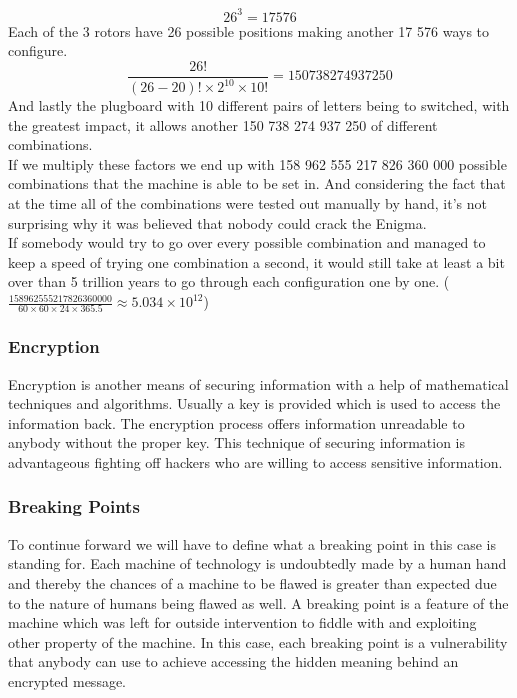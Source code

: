 \documentclass[conference,compsoc]{IEEEtran}
\begin{document}
\begin{equation}
    26^3=17576
\end{equation}
Each of the 3 rotors have 26 possible positions making another 17 576 ways to configure.\\
\begin{equation}
    \frac{26!}{(26-20)!\times2^{10}\times10!}=150738274937250
\end{equation}
And lastly the plugboard with 10 different pairs of letters being to switched, with the greatest impact, it allows another 150 738 274 937 250 of different combinations.\\
If we multiply these factors we end up with 158 962 555 217 826 360 000 possible combinations that the machine is able to be set in. And considering the fact that at the time all of the combinations were tested out manually by hand, it's not surprising why it was believed that nobody could crack the Enigma.\\
If somebody would try to go over every possible combination and managed to keep a speed of trying one combination a second, it would still take at least a bit over than 5 trillion years to go through each configuration one by one. ($\frac{158962555217826360000}{60\times60\times24\times365.5}\approx5.034\times10^{12}$)

\subsubsection{Encryption} Encryption is another means of securing information with a help of mathematical techniques and algorithms. Usually a key is provided which is used to access the information back. The encryption process offers information unreadable to anybody without the proper key. This technique of securing information is advantageous fighting off hackers who are willing to access sensitive information.\\

\subsubsection{Breaking Points} To continue forward we will have to define what a breaking point in this case is standing for. Each machine of technology is undoubtedly made by a human hand and thereby the chances of a machine to be flawed is greater than expected due to the nature of humans being flawed as well. A breaking point is a feature of the machine which was left for outside intervention to fiddle with and exploiting other property of the machine. In this case, each breaking point is a vulnerability that anybody can use to achieve accessing the hidden meaning behind an encrypted message.\\
\end{document}
